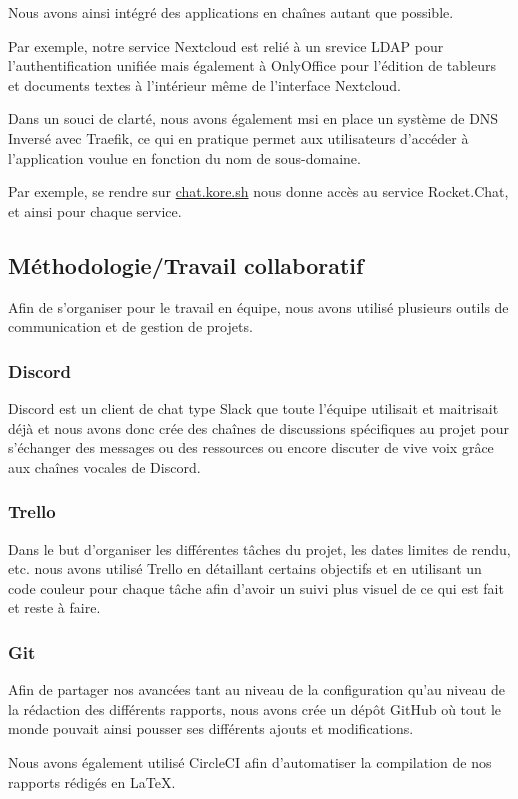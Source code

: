 Nous avons ainsi intégré des applications en chaînes autant que possible.

Par exemple, notre service Nextcloud est relié à un srevice LDAP pour l'authentification unifiée mais également à OnlyOffice pour l'édition de tableurs et documents textes à l'intérieur même de l'interface Nextcloud.

Dans un souci de clarté, nous avons également msi en place un système de DNS Inversé avec Traefik, ce qui en pratique permet aux utilisateurs d'accéder à l'application voulue en fonction du nom de sous-domaine.

Par exemple, se rendre sur \href{http://chat.kore.sh}{chat.kore.sh} nous donne accès au service Rocket.Chat, et ainsi pour chaque service.

\subsection{Méthodologie/Travail collaboratif}

Afin de s'organiser pour le travail en équipe, nous avons utilisé plusieurs outils de communication et de gestion de projets.

\subsubsection{Discord}

Discord est un client de chat type Slack que toute l'équipe utilisait et maitrisait déjà et nous avons donc crée des chaînes de discussions spécifiques au projet pour s'échanger des messages ou des ressources ou encore discuter de vive voix grâce aux chaînes vocales de Discord.

\subsubsection{Trello}

Dans le but d'organiser les différentes tâches du projet, les dates limites de rendu, etc. nous avons utilisé Trello en détaillant certains objectifs et en utilisant un code couleur pour chaque tâche afin d'avoir un suivi plus visuel de ce qui est fait et reste à faire.

\subsubsection{Git}

Afin de partager nos avancées tant au niveau de la configuration qu'au niveau de la rédaction des différents rapports, nous avons crée un dépôt GitHub où tout le monde pouvait ainsi pousser ses différents ajouts et modifications. 

Nous avons également utilisé CircleCI afin d'automatiser la compilation de nos rapports rédigés en \LaTeX .